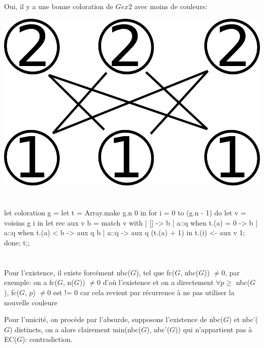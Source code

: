 \documentclass{article}
\begin{document}
			Oui, il y a une bonne coloration de $Gex2$ avec moins de couleurs:

			\includegraphics[scale=0.1]{IMG/PNG/4b.png}
			
		\section{}
			
			\begin{case}
let coloration g =
	let t = Array.make g.n 0 in
	for i = 0 to (g.n - 1) do
		let v = voisins g i in
			 let rec aux v b = match v with
			 | [] -> b
			 | a::q when t.(a) = 0 -> b
			 | a::q when t.(a) < b -> aux q b
			 | a::q -> aux q (t.(a) + 1)
			 in t.(i) <- aux v 1;
	done;
	t;;
			\end{case}
		
		\section{}
		
			Pour l'existence, il existe forcément nbc($G$), tel que fc($G$, nbc($G$)) $\neq 0$, par exemple:
	on a fc($G$, n($G$)) $\neq 0$ d'où l'existence et on a directement $\forall p \geq$ nbc($G$), fc($G$, $p$) $\neq 0$
	est != 0 car cela revient par récurrence à ne pas utiliser la nouvelle couleure

	Pour l'unicité, on procède par l'absurde, supposons l'existence de nbc($G$) et nbc'($G$)
	distincts, on a alors clairement min(nbc($G$), nbc'($G$)) qui
	n'appartient pas à EC($G$): contradiction.
		
		\section{}
		
\end{document}
